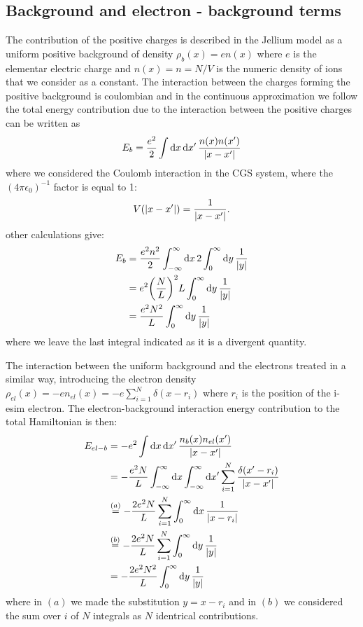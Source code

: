 \documentclass[a4paper]{article}
\begin{document}
\subsection*{Background and electron - background terms}
\noindent The contribution of the positive charges is described in the Jellium model as a uniform positive background of density $\rho_b(x) = e n(x)$ where $e$ is the elementar electric charge and $n(x) =n = N/V$ is the numeric density of ions that we consider as a constant.
The interaction between the charges forming the positive background is coulombian and in the continuous approximation we follow the total energy contribution due to the interaction between the positive charges can be written as
\begin{align}
E_b &= \frac{e^2}{2}\int \dd{x} \dd{x'} \frac{n(x)n(x')}{\abs{x-x'}}\\
\end{align}
where we considered the Coulomb interaction in the CGS system, where the $(4\pi\epsilon_0)^{-1}$ factor is equal to 1:
\begin{equation}
V(\abs{x-x'}) = \frac{1}{\abs{x-x'}}.
\end{equation}
other calculations give:
\begin{align}
E_b &= \frac{e^2n^2}{2} \int_{-\infty}^{\infty} \dd{x} 2\int_0^\infty \dd{y}\frac{1}{\abs{y}}\\
& = e^2 \pqty{\frac{N}{L}}^2 L \int_0^\infty \dd{y}\frac{1}{\abs{y}}\\
& = \frac{e^2N^2}{L}\int_0^\infty \dd{y}\frac{1}{\abs{y}}
\end{align}
where we leave the last integral indicated as it is a divergent quantity.

The interaction between the uniform background and the electrons treated in a similar way, introducing the electron density $\rho_{el}(x)= -e n_{el}(x) = -e\sum_{i=1}^N \delta(x-r_i)$ where $r_i$ is the position of the i-esim electron.
The electron-background interaction energy contribution to the total Hamiltonian is then:
\begin{align}
E_{el-b} & = -e^2\int \dd{x} \dd{x'}\frac{n_b(x)n_{el}(x')}{\abs{x-x'}}\\
&= -\frac{e^2 N}{L}\int_{-\infty}^\infty \dd{x} \int_{-\infty}^\infty \dd{x'}\sum_{i=1}^{N}\frac{\delta(x'-r_i)}{\abs{x-x'}}\\
&\stackrel{(a)}{=} -\frac{2e^2 N}{L}\sum_{i=1}^{N}\int_{0}^\infty \dd{x}\frac{1}{\abs{x-r_i}}\\
&\stackrel{(b)}{=} -\frac{2e^2 N}{L}\sum_{i=1}^{N}\int_{0}^\infty \dd{y}\frac{1}{\abs{y}}\\
&= -\frac{2e^2 N^2}{L}\int_{0}^\infty \dd{y}\frac{1}{\abs{y}}\\
\end{align}
where in $(a)$ we made the substitution $y = x-r_i$ and in $(b)$ we considered the sum over $i$ of $N$ integrals as $N$ identrical contributions.
\end{document}
